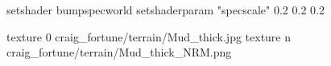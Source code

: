 setshader bumpspecworld
setshaderparam "specscale" 0.2 0.2 0.2

texture 0 craig_fortune/terrain/Mud_thick.jpg
texture n craig_fortune/terrain/Mud_thick_NRM.png